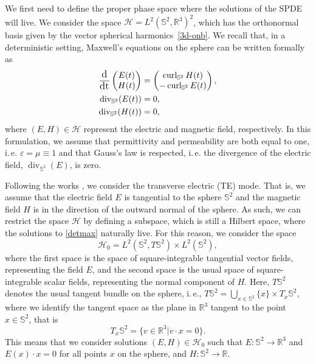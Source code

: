 \documentclass[11pt]{amsart}
\newcommand{\R}{{\mathbb R}}
\newcommand{\IS}{\mathbb{S}}
\begin{document}
We first need to
define the proper phase space where the solutions of the SPDE will live.
We consider the space $\mathcal{H}=L^2(\IS^2,\R^3)^{2}$,
which has the orthonormal basis given by the vector spherical harmonics~\eqref{3d-onb}.
We recall that, in a deterministic setting, Maxwell's equations on the sphere can be written formally
as
\begin{align}\label{detmax}
		\begin{split}
	\frac{\text{\large d}}{\text{\large dt}} \begin{pmatrix}
			E(t) \\ H(t)
		\end{pmatrix} &= \begin{pmatrix}
			\operatorname{curl}_{\IS^2} H(t) \\ -\operatorname{curl}_{\IS^2} E(t)
		\end{pmatrix},\\
		\operatorname{div}_{\IS^2}(E(t))&=0,\\
		\operatorname{div}_{\IS^2}(H(t))&=0,
		\end{split}
\end{align}
where $(E,H)\in \mathcal H$ represent the electric and magnetic field, respectively. In this formulation, we assume that permittivity and permeability are both equal to one, i.\,e. $\varepsilon=\mu\equiv1$ and that Gauss's law is respected, i.\,e. the divergence of the electric field, $\operatorname{div}_{\IS^2}(E)$, is zero.

Following the works \cite{MR3635830,FANG2025855,MR4739347}, we consider the transverse electric (TE) mode. That is, we assume that the electric field $E$ is tangential to the sphere $\IS^2$ and the magnetic field $H$ is in the direction
of the outward normal of the sphere. As such, we can restrict the space $\mathcal{H}$ by defining a subspace, which is still a Hilbert space, where the solutions to \eqref{detmax} naturally live. For this reason, we consider the space
\begin{equation}\label{spaceME}
	\mathcal{H}_0=L^2(\IS^2,T\IS^2)\times L^2(\IS^2),
\end{equation}
where the first space is the space of square-integrable tangential vector fields, representing the field $E$, and the second space is the usual space of square-integrable scalar fields, representing the normal component of $H$. Here, $T\IS^2$ denotes the usual tangent bundle on the sphere, i.\,e.,
$T\IS^2=\bigcup_{x\in\IS^2}\{x\}\times T_x\IS^2$, where we identify the tangent space as the plane in $\R^3$ tangent to the point $x\in \IS^2$, that is
$$
T_x\IS^2=\{v\in\R^3| v\cdot x=0\}.
$$
This means that we consider solutions $(E,H)\in\mathcal{H}_0$ such that $E\colon\IS^2\to\R^3$ and $E(x)\cdot x=0$ for all points $x$ on the sphere, and $H\colon\IS^2\to\R$.
\end{document}

